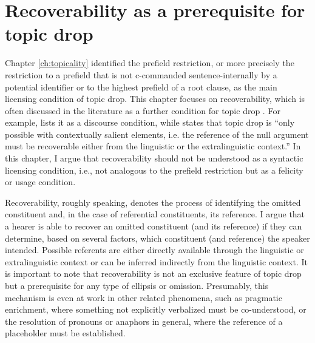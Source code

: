 \chapter{Recoverability as a prerequisite for topic drop}\label{ch:recover}
Chapter \ref{ch:topicality} identified the prefield restriction, or more precisely the restriction to a prefield that is not c-commanded sentence-internally by a potential identifier or to the highest prefield of a root clause, as the main licensing condition of topic drop.
This chapter focuses on recoverability, which is often discussed in the literature as a further condition for topic drop \citep[e.g.,][]{fries1988,cardinaletti1990,helmer2016,freywald2020}.
For example, \citet[27]{fries1988} lists it as a discourse condition, while \citet[75]{cardinaletti1990} states that topic drop is ``only possible with contextually salient  elements, i.e. the reference of the null argument must be recoverable either from the linguistic or the extralinguistic context.''
In this chapter, I argue that recoverability should not be understood as a syntactic licensing condition, i.e., not analogous to the prefield restriction but as a felicity or usage condition.

Recoverability, roughly speaking, denotes the process of identifying the omitted constituent and, in the case of referential constituents, its reference.
I argue that a hearer is able to recover an omitted constituent (and its reference) if they can determine, based on several factors, which constituent (and reference) the speaker intended.
Possible referents are either directly available through the linguistic or extralinguistic context or can be inferred indirectly from the linguistic context.
It is important to note that recoverability is not an exclusive feature of topic drop but a prerequisite for any type of ellipsis or omission.
Presumably, this mechanism is even at work in other related phenomena, such as pragmatic enrichment, where something not explicitly verbalized must be co-understood, or the resolution of pronouns or anaphors in general, where the reference of a placeholder must be established.

